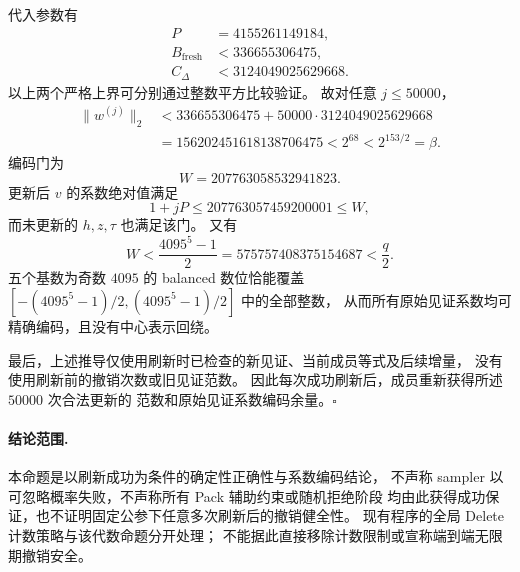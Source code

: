 代入参数有
\begin{align*}
 P&=4155261149184,\\
 B_{\mathrm{fresh}}&<336655306475,\\
 C_{\Delta}&<3124049025629668.
\end{align*}
以上两个严格上界可分别通过整数平方比较验证。
故对任意 $j\le50000$，
\begin{align*}
 \|w^{(j)}\|_2
 &<336655306475+50000\cdot3124049025629668\\
 &=156202451618138706475
 <2^{68}<2^{153/2}=\beta.
\end{align*}
编码门为
\[
 W=207763058532941823.
\]
更新后 $v$ 的系数绝对值满足
\[
 1+jP\le207763057459200001\le W,
\]
而未更新的 $h,z,\tau$ 也满足该门。
又有
\[
 W<\frac{4095^5-1}{2}
 =575757408375154687<\frac q2.
\]
五个基数为奇数 $4095$ 的 balanced 数位恰能覆盖
$[-(4095^5-1)/2,(4095^5-1)/2]$ 中的全部整数，
从而所有原始见证系数均可精确编码，且没有中心表示回绕。

最后，上述推导仅使用刷新时已检查的新见证、当前成员等式及后续增量，
没有使用刷新前的撤销次数或旧见证范数。
因此每次成功刷新后，成员重新获得所述 $50000$ 次合法更新的
范数和原始见证系数编码余量。\hfill$\square$

\paragraph{结论范围.}
本命题是以刷新成功为条件的确定性正确性与系数编码结论，
不声称 sampler 以可忽略概率失败，不声称所有 Pack 辅助约束或随机拒绝阶段
均由此获得成功保证，也不证明固定公参下任意多次刷新后的撤销健全性。
现有程序的全局 Delete 计数策略与该代数命题分开处理；
不能据此直接移除计数限制或宣称端到端无限期撤销安全。
